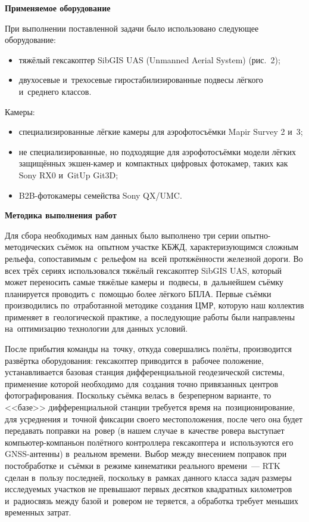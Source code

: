 \textbf{Применяемое оборудование}

При выполнении поставленной задачи было использовано следующее оборудование:

\begin{itemize}[noitemsep]\vspace{-8pt}
\item тяжёлый гексакоптер SibGIS UAS (Unmanned Aerial System) (рис.~2);
\item двухосевые и~трехосевые гиростабилизированные подвесы лёгкого и~среднего классов.
\end{itemize}
\vspace{-8pt}



Камеры:

\begin{itemize}[noitemsep]\vspace{-8pt}
\item специализированные лёгкие камеры для аэрофотосъёмки Mapir Survey 2 и~3;
\item не специализированные, но подходящие для аэрофотосъёмки модели лёгких защищённых экшен-камер и~компактных цифровых фотокамер, таких как Sony RX0 и~GitUp Git3D;
\item B2B-фотокамеры семейства Sony QX/UMC.
\end{itemize}
\vspace{-8pt}

\textbf{Методика выполнения работ}

Для сбора необходимых нам данных было выполнено три серии опытно-методических съёмок на~опытном участке КБЖД, характеризующимся сложным рельефа, сопоставимым с~рельефом на~всей протяжённости железной дороги. Во всех трёх сериях использовался тяжёлый гексакоптер SibGIS UAS, который может переносить самые тяжёлые камеры и~подвесы, в~дальнейшем съёмку планируется проводить с~помощью более лёгкого БПЛА. Первые съёмки производились по~отработанной методике создания ЦМР, которую наш коллектив применяет в~геологической практике, а последующие работы были направлены на~оптимизацию технологии для данных условий.

После прибытия команды на~точку, откуда совершались полёты, производится развёртка оборудования: гексакоптер приводится в~рабочее положение, устанавливается базовая станция дифференциальной геодезической системы, применение которой необходимо для~создания точно привязанных центров фотографирования. Поскольку съёмка велась в~безреперном варианте, то <<базе>> дифференциальной станции требуется время на~позиционирование, для усреднения и~точной фиксации своего местоположения, после чего она будет передавать поправки на~ровер (в нашем случае в~качестве ровера выступает компьютер-компаньон полётного контроллера гексакоптера и~используются его GNSS-антенны) в~реальном времени. Выбор между внесением поправок при постобработке и~съёмки в~режиме кинематики реального времени~--- RTK сделан в~пользу последней, поскольку в~рамках данного класса задач размеры исследуемых участков не превышают первых десятков квадратных километров и~радиосвязь между базой и~ровером не теряется, а обработка требует меньших временных затрат.

